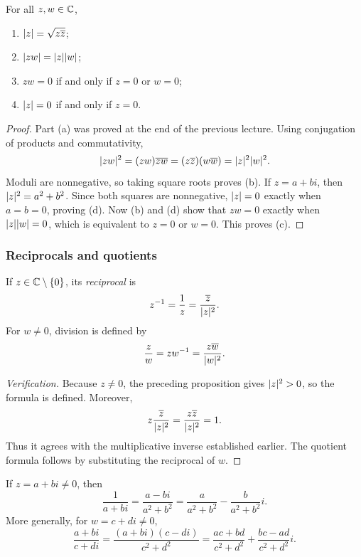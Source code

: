 \documentclass[11pt,a4paper]{amsart}
\begin{document}
\begin{proposition}
  For all \(z,w\in\mathbb{C}\),
  \begin{enumerate}[label=(\alph*)]
    \item \(\lvert z\rvert=\sqrt{z\overline z}\);
    \item \(\lvert zw\rvert=\lvert z\rvert\lvert w\rvert\);
    \item \(zw=0\) if and only if \(z=0\) or \(w=0\);
    \item \(\lvert z\rvert=0\) if and only if \(z=0\).
  \end{enumerate}
\end{proposition}

\begin{proof}
  Part (a) was proved at the end of the previous lecture.
  Using conjugation of products and commutativity,
  \[
    \lvert zw\rvert^{2}
    =(zw)\overline{zw}
    =(z\overline z)(w\overline w)
    =\lvert z\rvert^{2}\lvert w\rvert^{2}.
  \]
  Moduli are nonnegative, so taking square roots proves (b).
  If \(z=a+bi\), then \(\lvert z\rvert^{2}=a^{2}+b^{2}\).
  Since both squares are nonnegative, \(\lvert z\rvert=0\) exactly when
  \(a=b=0\), proving (d). Now (b) and (d) show that
  \(zw=0\) exactly when \(\lvert z\rvert\lvert w\rvert=0\), which is equivalent
  to \(z=0\) or \(w=0\). This proves (c).
\end{proof}

\subsubsection{Reciprocals and quotients}

\begin{definition}
  If \(z\in\mathbb{C}\setminus\{0\}\), its \emph{reciprocal} is
  \[
    z^{-1}=\frac1z=\frac{\overline z}{\lvert z\rvert^{2}}.
  \]
  For \(w\neq0\), division is defined by
  \[
    \frac zw=zw^{-1}=\frac{z\overline w}{\lvert w\rvert^{2}}.
  \]
\end{definition}

\begin{proof}[Verification]
  Because \(z\neq0\), the preceding proposition gives
  \(\lvert z\rvert^{2}>0\), so the formula is defined. Moreover,
  \[
    z\frac{\overline z}{\lvert z\rvert^{2}}
    =\frac{z\overline z}{\lvert z\rvert^{2}}=1.
  \]
  Thus it agrees with the multiplicative inverse established earlier.
  The quotient formula follows by substituting the reciprocal of \(w\).
\end{proof}

\begin{example}
  If \(z=a+bi\neq0\), then
  \[
    \frac1{a+bi}
    =\frac{a-bi}{a^{2}+b^{2}}
    =\frac{a}{a^{2}+b^{2}}-\frac{b}{a^{2}+b^{2}}i.
  \]
  More generally, for \(w=c+di\neq0\),
  \[
    \frac{a+bi}{c+di}
    =\frac{(a+bi)(c-di)}{c^{2}+d^{2}}
    =\frac{ac+bd}{c^{2}+d^{2}}
    +\frac{bc-ad}{c^{2}+d^{2}}i.
  \]
\end{example}
\end{document}
